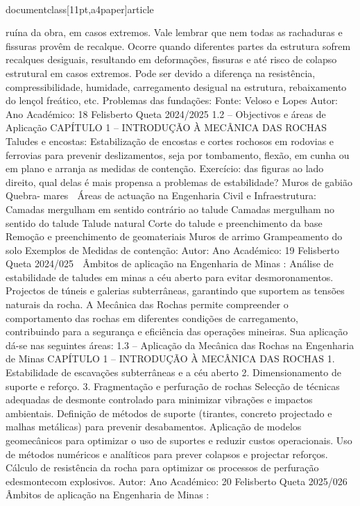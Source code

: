 \\documentclass[11pt,a4paper]{article}
\begin{document}
ruína da obra, em casos extremos. Vale 
lembrar que nem todas as rachaduras e 
fissuras provêm de recalque.
Ocorre quando diferentes partes da 
estrutura sofrem recalques desiguais, 
resultando em deformações, fissuras e 
até risco de colapso estrutural em 
casos extremos. Pode ser devido a 
diferença na resistência, 
compressibilidade, humidade, 
carregamento desigual na estrutura, 
rebaixamento do lençol freático, etc. 
Problemas das fundações:
Fonte: Veloso 
e Lopes
Autor:
Ano Académico:
18
Felisberto Queta
2024/2025
1.2 – Objectivos e áreas de Aplicação
CAPÍTULO 1 
–
 INTRODUÇÃO À MECÂNICA DAS ROCHAS
Taludes e encostas:
Estabilização de encostas e cortes rochosos em rodovias e ferrovias para prevenir
deslizamentos, seja por tombamento, flexão, em cunha ou em plano e arranja as
medidas de contenção.
Exercício: das figuras ao lado direito,
qual delas é mais propensa a problemas
de estabilidade?
Muros
de
gabião
Quebra-
mares
 Áreas de actuação na Engenharia Civil e Infraestrutura:
Camadas mergulham em
sentido contrário ao talude
Camadas mergulham no
sentido do talude
Talude natural
Corte do talude e
preenchimento da base
Remoção e preenchimento
de geomateriais
Muros
de
arrimo
Grampeamento
do solo
Exemplos de
Medidas de
contenção:
Autor:
Ano Académico:
19
Felisberto Queta
2024/025

 Âmbitos de aplicação na Engenharia de Minas
:
Análise de estabilidade de taludes em minas a céu aberto para evitar
desmoronamentos.
Projectos de túneis e galerias subterrâneas, garantindo que suportem as 
tensões naturais da rocha.
A Mecânica das Rochas permite compreender o comportamento das rochas em diferentes condições de carregamento, 
contribuindo para a segurança e eficiência das operações mineiras. Sua aplicação dá-se nas seguintes áreas:
1.3 – Aplicação da Mecânica das Rochas na Engenharia de Minas
CAPÍTULO 1 
–
 INTRODUÇÃO À MECÂNICA DAS ROCHAS
1. Estabilidade de escavações subterrâneas e 
a céu aberto
2. Dimensionamento de suporte e reforço.
3. Fragmentação e perfuração de rochas Selecção de técnicas adequadas de desmonte controlado para minimizar 
vibrações e impactos ambientais.
Definição de métodos de suporte (tirantes, concreto projectado e malhas
metálicas) para prevenir desabamentos.
Aplicação de modelos geomecânicos para optimizar o uso de suportes e 
reduzir custos operacionais.
Uso de métodos numéricos e analíticos para prever colapsos e projectar
reforços.
Cálculo de resistência da rocha para optimizar os processos de 
perfuração edesmontecom explosivos.
Autor:
Ano Académico:
20
Felisberto Queta
2025/026

 Âmbitos de aplicação na Engenharia de Minas
:
\end{document}
